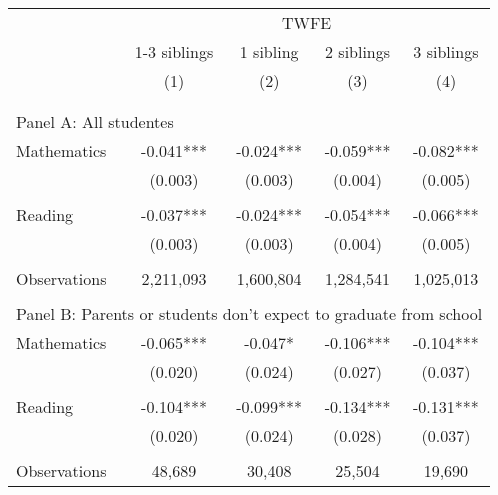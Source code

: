 \makeatletter
{}
{
\makeatother
\begin{tabular}{lcccc}
\toprule
\cmidrule(lr){2-5}
& \multicolumn{4}{c}{TWFE} \\
\cmidrule(lr){2-5}
& 1-3 siblings & 1 sibling & 2 siblings & 3 siblings  \\
\cmidrule(lr){2-2} \cmidrule(lr){3-3} \cmidrule(lr){4-4} \cmidrule(lr){5-5}
& (1) & (2) & (3) & (4) \\
\bottomrule
&  &  & &  \\
&  &  & &  \\
\multicolumn{5}{l}{Panel A: All studentes } \\
Mathematics         &      -0.041***&      -0.024***&      -0.059***&      -0.082***\\
                    &     (0.003)   &     (0.003)   &     (0.004)   &     (0.005)   \\
 
&  &  & &  \\
Reading             &      -0.037***&      -0.024***&      -0.054***&      -0.066***\\
                    &     (0.003)   &     (0.003)   &     (0.004)   &     (0.005)   \\
                    &               &               &               &               \\
Observations        &   2,211,093   &   1,600,804   &   1,284,541   &   1,025,013   \\
 
&  &  & &  \\
\multicolumn{5}{l}{Panel B: Parents or students don't expect to graduate from school} \\
Mathematics         &      -0.065***&      -0.047*  &      -0.106***&      -0.104***\\
                    &     (0.020)   &     (0.024)   &     (0.027)   &     (0.037)   \\
 
&  &  & &  \\
Reading             &      -0.104***&      -0.099***&      -0.134***&      -0.131***\\
                    &     (0.020)   &     (0.024)   &     (0.028)   &     (0.037)   \\
                    &               &               &               &               \\
Observations        &      48,689   &      30,408   &      25,504   &      19,690   \\
 

\end{tabular}}
